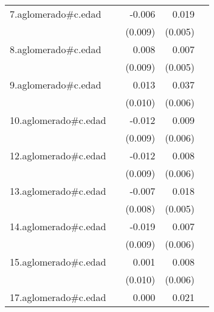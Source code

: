 {\begin{longtable}{l*{4}{D{.}{.}{-1}}}
\addlinespace
7.aglomerado#c.edad&                     &      -0.006         &       0.019\sym{***}&                     \\
            &                     &     (0.009)         &     (0.005)         &                     \\
\addlinespace
8.aglomerado#c.edad&                     &       0.008         &       0.007         &                     \\
            &                     &     (0.009)         &     (0.005)         &                     \\
\addlinespace
9.aglomerado#c.edad&                     &       0.013         &       0.037\sym{***}&                     \\
            &                     &     (0.010)         &     (0.006)         &                     \\
\addlinespace
10.aglomerado#c.edad&                     &      -0.012         &       0.009         &                     \\
            &                     &     (0.009)         &     (0.006)         &                     \\
\addlinespace
12.aglomerado#c.edad&                     &      -0.012         &       0.008         &                     \\
            &                     &     (0.009)         &     (0.006)         &                     \\
\addlinespace
13.aglomerado#c.edad&                     &      -0.007         &       0.018\sym{***}&                     \\
            &                     &     (0.008)         &     (0.005)         &                     \\
\addlinespace
14.aglomerado#c.edad&                     &      -0.019\sym{*}  &       0.007         &                     \\
            &                     &     (0.009)         &     (0.006)         &                     \\
\addlinespace
15.aglomerado#c.edad&                     &       0.001         &       0.008         &                     \\
            &                     &     (0.010)         &     (0.006)         &                     \\
\addlinespace
17.aglomerado#c.edad&                     &       0.000         &       0.021\sym{**} &                     \\

\end{longtable}}
